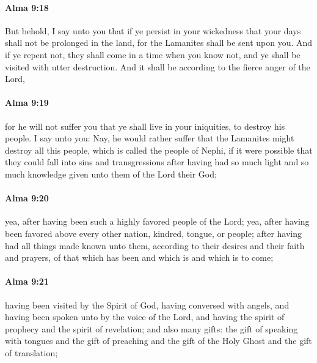 		\paragraph{Alma 9:18} %
			\label{ALMA-9-18}

			But behold, I say unto you that
			if ye persist in your wickedness
			that your days shall not be prolonged in the land,
			for the Lamanites shall be sent upon you.
			And if ye repent not,
			they shall come in a time when you know not,
			and ye shall be visited with utter destruction.
			And it shall be according to the fierce anger of the Lord,

		\paragraph{Alma 9:19} %
			\label{ALMA-9-19}

			for he will not suffer you that ye shall live in your iniquities,
			to destroy his people.
			I say unto you:
			Nay, he would rather suffer that the Lamanites might destroy all this people,
			which is called the people of Nephi,
			if it were possible that they could fall into sins and transgressions
			after having had so much light and so much knowledge
			given unto them of the Lord their God;

		\paragraph{Alma 9:20} %
			\label{ALMA-9-20}

			yea, after having been such a highly favored people of the Lord;
			yea, after having been favored above every other nation, kindred, tongue, or people;
			after having had all things made known unto them,
			according to their desires and their faith and prayers,
			of that which has been and which is and which is to come;

		\paragraph{Alma 9:21} %
			\label{ALMA-9-21}

			having been visited by the Spirit of God,
			having conversed with angels,
			and having been spoken unto by the voice of the Lord,
			and having the spirit of prophecy and the spirit of revelation;
			and also many gifts:
			the gift of speaking with tongues
			and the gift of preaching
			and the gift of the Holy Ghost
			and the gift of translation;


